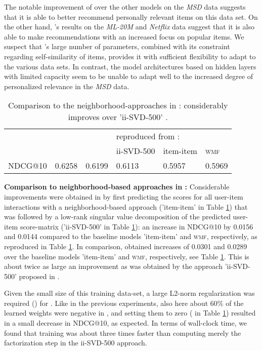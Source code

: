 \documentclass[sigconf]{acmart}
\newcommand{\wmf}{{\scshape wmf}}
\newcommand{\sae}{}
\begin{document}
The notable  improvement of \sae{}  over the other models on the   \emph{MSD} data suggests that it is able to better recommend personally relevant items on this data set. On the other hand, \sae{}'s results on  the  \emph{ML-20M} and \emph{Netflix} data suggest that it is also able to make recommendations with an increased focus on popular items. We suspect that \sae's large number of parameters, combined with its constraint regarding self-similarity of items,  provides it with sufficient flexibility to adapt to the various data sets. In contrast, the model architectures based on hidden layers with limited capacity seem to be unable to adapt well to the increased degree of  personalized relevance in the \emph{MSD} data.




\begin{table}[t]
\caption{Comparison to the neighborhood-approaches in \cite{volkovs15}: \sae{} considerably improves over 'ii-SVD-500' \cite{volkovs15}.}
\label{tab_nn}
\begin{tabular}{llllll}
\hline
        &       \sae{}          &     \sae{}              & \multicolumn{3}{l}{reproduced from \cite{volkovs15}: }\\
       &        &    &   ii-SVD-500   & item-item    & \wmf{}  \\
\hline
NDCG@10   &      0.6258      &  0.6199       &       0.6113         &      0.5957   &    0.5969\\
\hline
\end{tabular}
\end{table}



{\bf Comparison to neighborhood-based approaches in \cite{volkovs15}:}
Considerable improvements were obtained in \cite{volkovs15} by first predicting the scores for all user-item interactions with a neighborhood-based approach ('item-item' in Table \ref{tab_nn}) that was followed by a low-rank singular value decomposition  of the predicted user-item score-matrix ('ii-SVD-500' in Table \ref{tab_nn}): an increase in NDCG@10 by 0.0156  and 0.0144 compared to  the baseline models  'item-item' and \wmf{}, respectively, as reproduced in Table \ref{tab_nn}. In comparison, \sae{} obtained  increases of 0.0301 and  0.0289  over the baseline models  'item-item' and \wmf{}, respectively, see Table \ref{tab_nn}. This is about twice as large an improvement as was obtained by the approach 'ii-SVD-500' proposed in \cite{volkovs15}.

Given the small size of this training data-set, a  large L2-norm regularization was required () for \sae{}. Like in the previous experiments, also here about 60\% of the learned weights were negative in \sae, and setting them to zero (\sae{} in Table \ref{tab_nn}) resulted in  a small decrease in NDCG@10, as expected. 
 In terms of wall-clock time, we found that training \sae{}  was about three times faster than computing merely the  factorization step in the ii-SVD-500 approach. 
\end{document}
